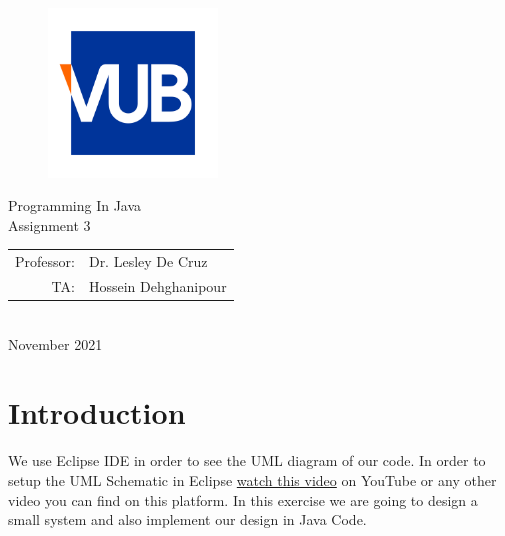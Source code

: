 \documentclass[12pt , a4paper]{article}
\begin{document}
%
%
\thispagestyle{empty}
 \begin{center}


\begin{figure}[H]
\centering
\includegraphics[width=0.4\textwidth]{VUB_Logo.jpg}
\caption*{}
\label{f-0-0}
\end{figure}
{
\centering
{}  
\fontsize{18pt}{18pt}
\selectfont 
Programming In Java
}
\\[20pt]
{
\centering
{}  
\fontsize{16pt}{16pt}
\selectfont 
Assignment 3
}
\\[20pt]
{
\centering
{}  
\fontsize{12pt}{12pt}
\selectfont 
\begin{tabular}{r l}
Professor:			&	Dr. Lesley De Cruz\\[5pt]
TA:				&	Hossein Dehghanipour\\[5pt]

\end{tabular}
}
\\[20pt]
{
\centering
{}  
\fontsize{12pt}{12pt}
\selectfont 
November 2021
}

\end{center}
 

 
\setmainfont{Times New Roman}
\newpage

%
%
\tableofcontents
\newpage


%
%
\section{Introduction}
We use Eclipse IDE in order to see the UML diagram of our code. In order to setup the UML Schematic in Eclipse \href{https://youtu.be/0Zlh56mTS6c}{watch this video} on YouTube or any other video you can find on this platform. In this exercise we are going to design a small system and also implement our design in Java Code.
\end{document}
